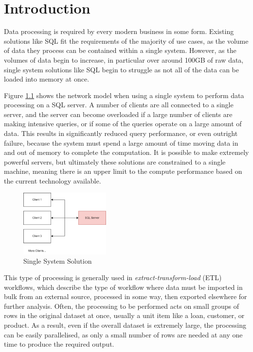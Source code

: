 \chapter{Introduction}\label{cha:intro}

Data processing is required by every modern business in some form. Existing solutions like SQL fit the requirements of the majority of use cases, as the volume of data they process can be contained within a single system. However, as the volumes of data begin to increase, in particular over around 100GB of raw data, single system solutions like SQL begin to struggle as not all of the data can be loaded into memory at once. 

Figure \ref{fig:single-system-solution} shows the network model when using a single system to perform data processing on a SQL server. A number of clients are all connected to a single server, and the server can become overloaded if a large number of clients are making intensive queries, or if some of the queries operate on a large amount of data. This results in significantly reduced query performance, or even outright failure, because the system must spend a large amount of time moving data in and out of memory to complete the computation. It is possible to make extremely powerful servers, but ultimately these solutions are constrained to a single machine, meaning there is an upper limit to the compute performance based on the current technology available.

\begin{figure}[h]
	\centering
	\includegraphics[width=0.4\textwidth]{chapters/diagrams/design/single-system-solution}
	\caption{Single System Solution}
	\label{fig:single-system-solution}
\end{figure}

This type of processing is generally used in \textit{extract-transform-load} (ETL) workflows, which describe the type of workflow where data must be imported in bulk from an external source, processed in some way, then exported elsewhere for further analysis. Often, the processing to be performed acts on small groups of rows in the original dataset at once, usually a unit item like a loan, customer, or product. As a result, even if the overall dataset is extremely large, the processing can be easily parallelised, as only a small number of rows are needed at any one time to produce the required output.

